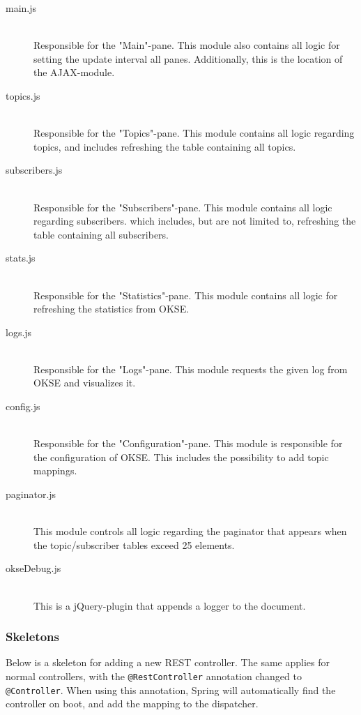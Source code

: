 \begin{description}
    \item[main.js] \hfill \\ Responsible for the "Main"-pane. This module also contains all logic for setting the update interval all panes. Additionally, this is the location of the AJAX-module. 
    \item[topics.js] \hfill \\ Responsible for the "Topics"-pane. This module contains all logic regarding topics, and includes refreshing the table containing all topics. 
    \item[subscribers.js] \hfill \\ Responsible for the "Subscribers"-pane. This module contains all logic regarding subscribers. which includes, but are not limited to, refreshing the table containing all subscribers. 
    \item[stats.js] \hfill \\ Responsible for the "Statistics"-pane. This module contains all logic for refreshing the statistics from OKSE.
    \item[logs.js] \hfill \\ Responsible for the "Logs"-pane. This module requests the given log from OKSE and visualizes it.
    \item[config.js] \hfill \\ Responsible for the "Configuration"-pane. This module is responsible for the configuration of OKSE. This includes the possibility to add topic mappings. 
    \item[paginator.js] \hfill \\ This module controls all logic regarding the paginator that appears when the topic/subscriber tables exceed 25 elements. 
    \item[okseDebug.js] \hfill \\ This is a jQuery-plugin that appends a logger to the document.
\end{description}



\subsubsection{Skeletons}
\label{subsubsec:skeletons}

Below is a skeleton for adding a new REST controller. The same applies for normal controllers, with the \verb!@RestController! annotation changed to \verb!@Controller!. When using this annotation, Spring will automatically find the controller on boot, and add the mapping to the dispatcher. 

